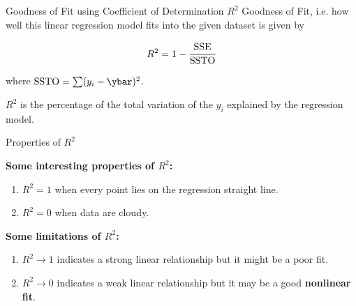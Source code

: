 \documentclass[aspectratio=169,xcolor=dvipsnames,svgnames,x11names,fleqn]{beamer}
\begin{document}
    \begin{frame}{Goodness of Fit using Coefficient of Determination $R^2$}
    Goodness of Fit, i.e. how well this linear regression model fits into the given dataset is given by 
    \begin{facts}{}
        {
        \LARGE
        \begin{center}
            \begin{equation*}
        R^2 = 1-\cfrac{\textrm{SSE}}{\textrm{SSTO}}
    \end{equation*}
        \end{center}
        }
    \end{facts}
    
    where $\textrm{SSTO} = \sum (y_i - \ybar)^2$.

    $R^2$ is the percentage of the total variation of the $y_i$ explained by the regression model.

\end{frame}
    
     \begin{frame}{Properties of $R^2$}


    \textbf{Some interesting properties of $R^2$:}
    \begin{enumerate}
        \item $R^2 = 1$ when every point lies on the regression straight line.
        \item $R^2 = 0$ when data are cloudy.
    \end{enumerate}
    \textbf{Some limitations of $R^2$:}
    \begin{enumerate}
        \item $R^2 \to 1$ indicates a strong linear relationship but it might be a poor fit.
        \item $R^2 \to 0$ indicates a weak linear relationship but it may be a good \textbf{nonlinear fit}.
    \end{enumerate}
    
    \end{frame}
    

\end{document}
